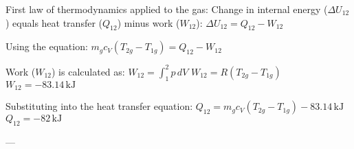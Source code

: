 First law of thermodynamics applied to the gas:  
Change in internal energy (\( \Delta U_{12} \)) equals heat transfer (\( Q_{12} \)) minus work (\( W_{12} \)):  
\( \Delta U_{12} = Q_{12} - W_{12} \)  

Using the equation:  
\( m_g c_V (T_{2g} - T_{1g}) = Q_{12} - W_{12} \)  

Work (\( W_{12} \)) is calculated as:  
\( W_{12} = \int_{1}^{2} p \, dV \)  
\( W_{12} = R(T_{2g} - T_{1g}) \)  
\( W_{12} = -83.14 \, \text{kJ} \)  

Substituting into the heat transfer equation:  
\( Q_{12} = m_g c_V (T_{2g} - T_{1g}) - 83.14 \, \text{kJ} \)  
\( Q_{12} = -82 \, \text{kJ} \)  

---